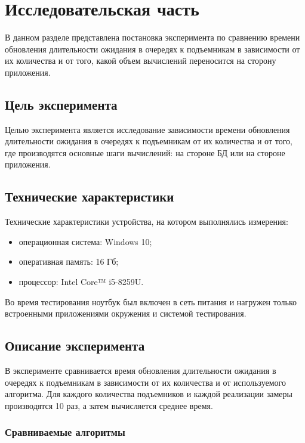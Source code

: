 \chapter{Исследовательская часть}

В данном разделе представлена постановка эксперимента по сравнению времени обновления длительности ожидания в очередях к подъемникам в зависимости от их количества и от того, какой объем вычислений переносится на сторону приложения.


\section{Цель эксперимента}

Целью эксперимента является исследование зависимости времени обновления длительности ожидания в очередях к подъемникам от их количества и от того, где производятся основные шаги вычислений: на стороне БД или на стороне приложения.

\section{Технические характеристики}

Технические характеристики устройства, на котором выполнялись измерения:

\begin{itemize}
	\item операционная система: Windows 10;
	\item оперативная память: 16 Гб;
	\item процессор: Intel Core™ i5-8259U.
\end{itemize}

Во время тестирования ноутбук был включен в сеть питания и нагружен только встроенными приложениями окружения и системой тестирования.


\section{Описание эксперимента}

В эксперименте сравнивается время обновления длительности ожидания в очередях к подъемникам в зависимости от их количества и от используемого алгоритма. Для каждого количества подъемников и каждой реализации замеры производятся 10 раз, а затем вычисляется среднее время.

\subsection{Сравниваемые алгоритмы}


